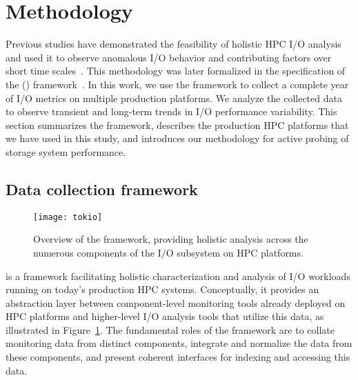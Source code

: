 \section{Methodology}\label{sec:methods}

Previous studies have demonstrated the feasibility of 
holistic HPC I/O analysis and used it to observe anomalous I/O behavior and
contributing factors over short time scales~\cite{Lockwood2017}. This methodology was later formalized in the specification of the \tokio (\tokiolong) framework~\cite{Lockwood2018tokio}. 
In this work, we use 
the \tokio framework
to collect 
a complete
year of I/O metrics on multiple production platforms. We analyze the collected data to observe transient and long-term trends in I/O performance variability.  This section
summarizes the \tokio framework, 
describes the production HPC platforms that we have 
used in this study,
and introduces our methodology for active probing of storage system
performance.

\subsection{Data collection framework}\label{sec:methods/tokio}


\begin{figure}
    \centering
    \texttt{[image: tokio]}
        \vspace{-.1in}
    \caption{Overview of the \tokio framework, providing holistic analysis across the numerous components of the I/O subsystem on HPC platforms.}
    \label{fig:tokio-framework}
\end{figure}

\tokio is a framework facilitating holistic characterization and analysis of I/O workloads running on today's production HPC systems. Conceptually, it provides an abstraction layer between component-level monitoring tools already deployed on HPC platforms and higher-level I/O analysis tools that utilize this data, as illustrated in  Figure~\ref{fig:tokio-framework}. The fundamental roles of the \tokio framework are to collate monitoring data from distinct components, integrate and normalize the data from these components, and present coherent interfaces for indexing and accessing this data.

